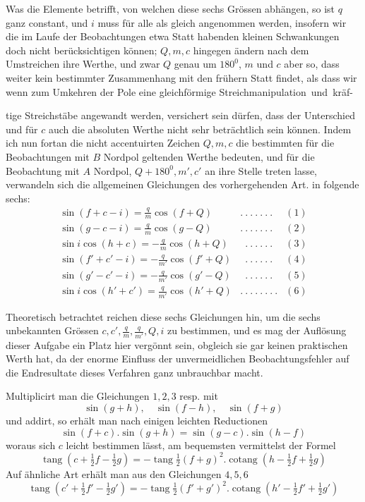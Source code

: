 Was die Elemente betrifft, von welchen diese sechs Grössen abhängen, so ist $q$ ganz constant, und $i$ muss für alle als gleich angenommen werden, insofern wir die im Laufe der Beobachtungen etwa Statt habenden kleinen Schwankungen doch nicht berücksichtigen können; $Q,m,c$ hingegen ändern nach dem Umstreichen ihre Werthe, und zwar $Q$ genau um $180^0$, $m$ und $c$ aber so, dass weiter kein bestimmter Zusammenhang mit den frühern Statt findet, als dass wir wenn zum Umkehren der Pole eine gleichförmige \mbox{Streichmanipulation und kräf-}
\par\clearpage
{}
\noindent tige Streichstäbe angewandt werden, versichert sein dürfen, dass der Unterschied und für $c$ auch die absoluten Werthe nicht sehr beträchtlich sein können. Indem ich nun fortan die nicht accentuirten Zeichen $Q,m,c$ die bestimmten für die Beobachtungen mit $B$ Nordpol geltenden Werthe bedeuten, und für die Beobachtung mit $A$ Nordpol, $Q+180^0,m',c'$ an ihre Stelle treten lasse, verwandeln sich die allgemeinen Gleichungen des vorhergehenden Art. in folgende sechs:
\[
\begin{array}{lll}
\sin(f+c-i)=\frac{q}{m}\cos(f+Q)&.\ .\ .\ .\ .\ .\ .&(1)\\[4pt]
\sin(g-c-i)=\frac{q}{m}\cos(g-Q)&.\ .\ .\ .\ .\ .\ .&(2)\\[4pt]
\sin i\cos(h+c)=-\frac{q}{m}\cos(h+Q)&\phantom{.}\ .\ .\ .\ .\ .\ .&(3)\\[4pt]
\sin(f'+c'-i)=-\frac{q}{m'}\cos(f'+Q)&\phantom{.}\ .\ .\ .\ .\ .\ .&(4)\\[4pt]
\sin(g'-c'-i)=-\frac{q}{m'}\cos(g'-Q)&\phantom{.}\ .\ .\ .\ .\ .\ .&(5)\\[4pt]
\sin i\cos(h'+c')=\frac{q}{m'}\cos(h'+Q)&.\ .\ .\ .\ .\ .\ .\ .&(6)
\end{array}
\]

Theoretisch betrachtet reichen diese sechs Gleichungen hin, um die sechs unbekannten Grössen $c,c',\frac{q}{m},\frac{q}{m'},Q,i$ zu bestimmen, und es mag der Auflösung dieser Aufgabe ein Platz hier vergönnt sein, obgleich sie gar keinen praktischen Werth hat, da der enorme Einfluss der unvermeidlichen Beobachtungsfehler auf die Endresultate dieses Verfahren ganz unbrauchbar macht.

Multiplicirt man die Gleichungen $1,2,3$ resp. mit
\[
\sin(g+h),\quad\sin(f-h),\quad\sin(f+g)
\]
und addirt, so erhält man nach einigen leichten Reductionen
\[
\sin(f+c).\sin(g+h)=\sin(g-c).\sin(h-f)
\]
woraus sich $c$ leicht bestimmen lässt, am bequemsten vermittelst der Formel
\[
\operatorname{tang}(c+\tfrac{1}{2}f-\tfrac{1}{2}g)=-\operatorname{tang}\tfrac{1}{2}(f+g)^2.\operatorname{cotang}(h-\tfrac{1}{2}f+\tfrac{1}{2}g)
\]
Auf ähnliche Art erhält man aus den Gleichungen $4,5,6$
\[
\operatorname{tang}(c'+\tfrac{1}{2}f'-\tfrac{1}{2}g')=-\operatorname{tang}\tfrac{1}{2}(f'+g')^2.\operatorname{cotang}(h'-\tfrac{1}{2}f'+\tfrac{1}{2}g')
\]
